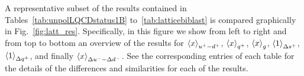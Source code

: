 A representative subset of the results contained in
Tables~\ref{tab:unpolLQCDstatus1B} to~\ref{tab:latticebiblast}
is compared graphically in  
Fig.~\ref{fig:latt_res}.
%
Specifically, in this figure we show from left to right and from top to bottom
an overview of 
  the results for $\left\langle x\right\rangle_{u^+-d^+}$, $\left\langle x\right\rangle_{q^+}$, $\left\langle x\right\rangle_{g}$,
  $\left\langle 1 \right\rangle_{\Delta s^+}$, $\left\langle 1\right\rangle_{\Delta q^+}$, and finally
  $\left\langle x\right\rangle_{\Delta u^- - \Delta d^-}$.
  See the corresponding entries of each table for
  the details of the differences and similarities for each
  of the results.

\begin{figure}[t]
\begin{center}
\centerline{
}
\centerline{
}
\end{center}
\end{figure}
